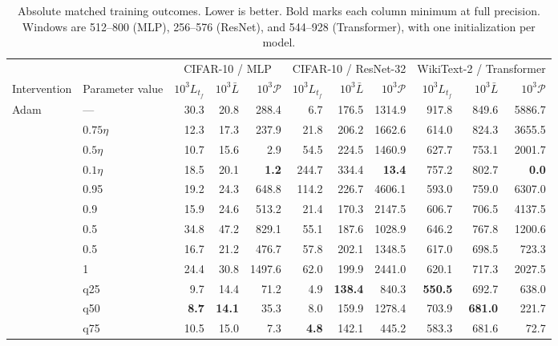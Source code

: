 \begin{table}[!tp]
\caption{Absolute matched training outcomes. Lower is better. Bold marks each column minimum at full precision. Windows are 512--800 (MLP), 256--576 (ResNet), and 544--928 (Transformer), with one initialization per model.}
\label{tab:vc-outcomes}
\centering\fontsize{8.5}{10.5}\selectfont
\setlength{\tabcolsep}{4pt}
\renewcommand{\arraystretch}{1.13}
\begin{tabular}{llrrrrrrrrr}
\toprule
 & & \multicolumn{3}{c}{CIFAR-10 / MLP} & \multicolumn{3}{c}{CIFAR-10 / ResNet-32} & \multicolumn{3}{c}{WikiText-2 / Transformer} \\
\cmidrule(lr){3-5}\cmidrule(lr){6-8}\cmidrule(lr){9-11}
Intervention & Parameter value & $10^3 L_{t_f}$ & $10^3\bar L$ & $10^3\mathcal P$ & $10^3 L_{t_f}$ & $10^3\bar L$ & $10^3\mathcal P$ & $10^3 L_{t_f}$ & $10^3\bar L$ & $10^3\mathcal P$ \\
\midrule
Adam & --- & 30.3 & 20.8 & 288.4 & 6.7 & 176.5 & 1314.9 & 917.8 & 849.6 & 5886.7 \\
\addlinespace[3pt]
\multirow{3}{*}{LR reduction} & $0.75\eta$ & 12.3 & 17.3 & 237.9 & 21.8 & 206.2 & 1662.6 & 614.0 & 824.3 & 3655.5 \\
 & $0.5\eta$ & 10.7 & 15.6 & 2.9 & 54.5 & 224.5 & 1460.9 & 627.7 & 753.1 & 2001.7 \\
 & $0.1\eta$ & 18.5 & 20.1 & \textbf{1.2} & 244.7 & 334.4 & \textbf{13.4} & 757.2 & 802.7 & \textbf{0.0} \\
\addlinespace[3pt]
\multirow{3}{*}{$\beta_2$ reduction} & 0.95 & 19.2 & 24.3 & 648.8 & 114.2 & 226.7 & 4606.1 & 593.0 & 759.0 & 6307.0 \\
 & 0.9 & 15.9 & 24.6 & 513.2 & 21.4 & 170.3 & 2147.5 & 606.7 & 706.5 & 4137.5 \\
 & 0.5 & 34.8 & 47.2 & 829.1 & 55.1 & 187.6 & 1028.9 & 646.2 & 767.8 & 1200.6 \\
\addlinespace[3pt]
\multirow{2}{*}{Gradient clipping} & 0.5 & 16.7 & 21.2 & 476.7 & 57.8 & 202.1 & 1348.5 & 617.0 & 698.5 & 723.3 \\
 & 1 & 24.4 & 30.8 & 1497.6 & 62.0 & 199.9 & 2441.0 & 620.1 & 717.3 & 2027.5 \\
\addlinespace[3pt]
\multirow{3}{*}{Displacement cap} & q25 & 9.7 & 14.4 & 71.2 & 4.9 & \textbf{138.4} & 840.3 & \textbf{550.5} & 692.7 & 638.0 \\
 & q50 & \textbf{8.7} & \textbf{14.1} & 35.3 & 8.0 & 159.9 & 1278.4 & 703.9 & \textbf{681.0} & 221.7 \\
 & q75 & 10.5 & 15.0 & 7.3 & \textbf{4.8} & 142.1 & 445.2 & 583.3 & 681.6 & 72.7 \\
\bottomrule
\end{tabular}
\end{table}
